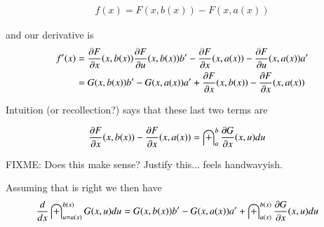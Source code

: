 \documentclass{article}
\begin{document}
\begin{align*}
f(x) = F(x,b(x)) - F(x,a(x))
\end{align*}

and our derivative is
\begin{align*}
f'(x)
&=
\PD{x}{F}(x,b(x))
\PD{u}{F}(x,b(x)) b'
-\PD{x}{F}(x,a(x))
-\PD{u}{F}(x,a(x)) a' \\
&=
G(x,b(x)) b'
-G(x,a(x)) a'
+\PD{x}{F}(x,b(x))
-\PD{x}{F}(x,a(x))
\\
\end{align*}

Intuition (or recollection?) says that these last two terms are

\begin{align*}
\PD{x}{F}(x,b(x))
-\PD{x}{F}(x,a(x))
&=
\int_{a}^b \PD{x}{G}(x,u) du
\end{align*}

FIXME: Does this make sense?   Justify this... feels handwavyish.

Assuming that is right we then have
\begin{align}\label{eqn:diffInt}
\frac{d}{dx} \int_{u = a(x)}^{b(x)} G(x,u) du
&=
G(x,b(x)) b'
-G(x,a(x)) a'
+ \int_{a(x)}^{b(x)} \PD{x}{G}(x,u) du
\end{align}



\end{document}
